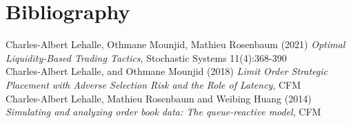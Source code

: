 \documentclass[12pt,a4paper]{article}
\theoremstyle{definition}
\theoremstyle{remark}
\begin{document}
    \section*{Bibliography}

    Charles-Albert Lehalle, Othmane Mounjid, Mathieu Rosenbaum (2021) \textit{Optimal Liquidity-Based Trading Tactics}, Stochastic Systems 11(4):368-390 
    \\
    Charles-Albert Lehalle, and Othmane Mounjid (2018) \textit{Limit Order Strategic Placement
    with Adverse Selection Risk
    and the Role of Latency}, CFM
    \\
    Charles-Albert Lehalle, Mathieu Rosenbaum and Weibing Huang (2014) \textit{Simulating and analyzing order book data: The queue-reactive model}, CFM



    
\end{document}
